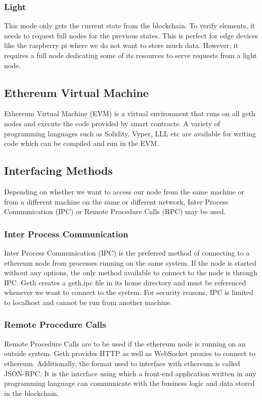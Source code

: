 \documentclass[11pt,openright]{report}
\begin{document}
\subsubsection{Light}
This mode only gets the current state from the blockchain. To verify elements, it needs to request full nodes for the previous states. This is perfect for edge devices like the raspberry pi where we do not want to store much data. However, it requires a full node dedicating some of its resources to serve requests from a light node.

\subsection{Ethereum Virtual Machine}
Ethereum Virtual Machine (EVM) is a virtual environment that runs on all geth nodes and execute the code provided by smart contracts. A variety of programming languages such as Solidity, Vyper, LLL etc are available for writing code which can be compiled and run in the EVM.

\subsection{Interfacing Methods}
Depending on whether we want to access our node from the same machine or from a different machine on the same or different network, Inter Process Communication (IPC) or Remote Procedure Calls (RPC) may be used.

\subsubsection{Inter Process Communication}
Inter Process Communication (IPC) is the preferred method of connecting to a ethereum node from processes running on the same system. If the node is started without any options, the only method available to connect to the node is through IPC. Geth creates a geth.ipc file in its home directory and must be referenced whenever we want to connect to the system. For security reasons, IPC is limited to localhost and cannot be run from another machine.

\subsubsection{Remote Procedure Calls}
Remote Procedure Calls are to be used if the ethereum node is running on an outside system. Geth provides HTTP as well as WebSocket proxies to connect to ethereum. Additionally, the format used to interface with ethereum is called JSON-RPC. It is the interface using which a front-end application written in any programming language can communicate with the business logic and data stored in the blockchain.
\end{document}
